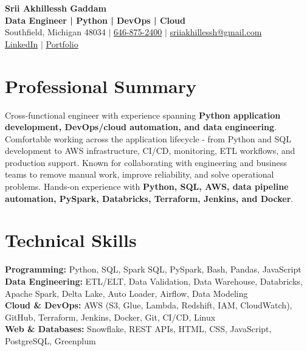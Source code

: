 \documentclass[letterpaper,10pt]{article}
\begin{document}
\fontsize{9.35pt}{10.45pt}\selectfont

\begin{center}
    {\LARGE \textbf{Srii Akhillessh Gaddam}} \\[-1pt]
    \textbf{Data Engineer | Python | DevOps | Cloud} \\[2pt]
    Southfield, Michigan 48034 $|$
    \href{tel:6468752400}{646-875-2400} $|$
    \href{mailto:sriiakhillessh@gmail.com}{sriiakhillessh@gmail.com} \\[1pt]
    \href{https://www.linkedin.com/in/srii-akhiilessh-gaddam-b48668191/}{LinkedIn} $|$
    \href{https://sriiakhillesshg.github.io/portfolio/}{Portfolio}
\end{center}
\vspace{-8pt}

\section{Professional Summary}
\small{Cross-functional engineer with experience spanning \textbf{Python application development, DevOps/cloud automation, and data engineering}. Comfortable working across the application lifecycle - from Python and SQL development to AWS infrastructure, CI/CD, monitoring, ETL workflows, and production support. Known for collaborating with engineering and business teams to remove manual work, improve reliability, and solve operational problems. Hands-on experience with \textbf{Python, SQL, AWS, data pipeline automation, PySpark, Databricks, Terraform, Jenkins, and Docker}.}

\section{Technical Skills}
\small{
\textbf{Programming:} Python, SQL, Spark SQL, PySpark, Bash, Pandas, JavaScript \\
\textbf{Data Engineering:} ETL/ELT, Data Validation, Data Warehouse, Databricks, Apache Spark, Delta Lake, Auto Loader, Airflow, Data Modeling \\
\textbf{Cloud \& DevOps:} AWS (S3, Glue, Lambda, Redshift, IAM, CloudWatch), GitHub, Terraform, Jenkins, Docker, Git, CI/CD, Linux \\
\textbf{Web \& Databases:} Snowflake, REST APIs, HTML, CSS, JavaScript, PostgreSQL, Greenplum
}
\end{document}
